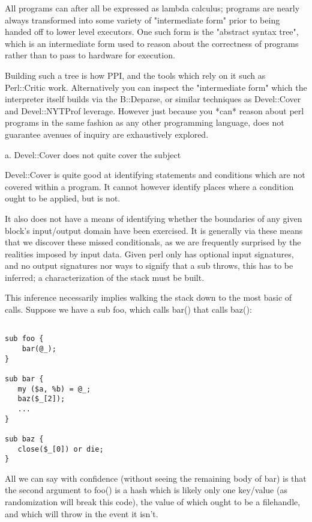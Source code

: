 \documentclass[twoside]{article}
\begin{document}
All programs can after all be expressed as lambda calculus; programs are nearly always transformed into some variety of "intermediate form" prior to being handed off to lower level executors.
One such form is the "abstract syntax tree", which is an intermediate form used to reason about the correctness of programs rather than to pass to hardware for execution.

Building such a tree is how PPI, and the tools which rely on it such as Perl::Critic work.
Alternatively you can inspect the "intermediate form" which the interpreter itself builds via the B::Deparse, or similar techniques as Devel::Cover and Devel::NYTProf leverage.
However just because you *can* reason about perl programs in the same fashion as any other programming language, does not guarantee avenues of inquiry are exhaustively explored.

a. Devel::Cover does not quite cover the subject

Devel::Cover is quite good at identifying statements and conditions which are not covered within a program.
It cannot however identify places where a condition ought to be applied, but is not.

It also does not have a means of identifying whether the boundaries of any given block's input/output domain have been exercised.
It is generally via these means that we discover these missed conditionals, as we are frequently surprised by the realities imposed by input data.
Given perl only has optional input signatures, and no output signatures nor ways to signify that a sub throws, this has to be inferred; a characterization of the stack must be built.

This inference necessarily implies walking the stack down to the most basic of calls.
Suppose we have a sub foo, which calls bar() that calls baz():

\begin{lstlisting}

sub foo {
    bar(@_);
}

sub bar {
   my ($a, %b) = @_;
   baz($_[2]);
   ...
}

sub baz {
   close($_[0]) or die;
}

\end{lstlisting}

All we can say with confidence (without seeing the remaining body of bar) is that the second argument to foo() is a hash which is likely only one key/value (as randomization will break this code), the value of which ought to be a filehandle, and which will throw in the event it isn't.
\end{document}
